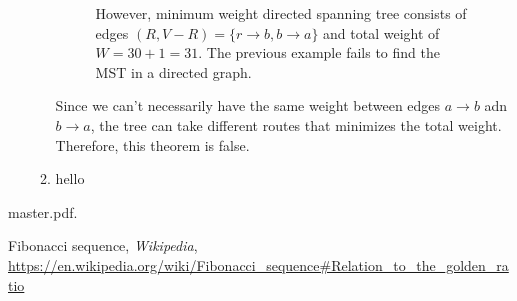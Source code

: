 \documentclass{article}
\begin{document}
\begin{enumerate}
\begin{enumerate}
\begin{figure}[H]
\begin{minipage}{0.4\textwidth}
          \caption{However, minimum weight directed spanning tree consists of edges $(R,V-R)=\{r\rightarrow b,b\rightarrow a\}$ and total weight of $W=30+1=31$. The previous example fails to find the MST in a directed graph.}
        \end{minipage}
      \end{figure}

      Since we can't necessarily have the same weight between edges $a\rightarrow b$ adn $b\rightarrow a$, the tree can take different routes that minimizes the total weight. Therefore, this theorem is false.

      \item hello
    \end{enumerate}
\end{enumerate}

\begin{thebibliography}{9}

master.pdf.

Fibonacci sequence, \emph{Wikipedia}, \url{https://en.wikipedia.org/wiki/Fibonacci_sequence#Relation_to_the_golden_ratio}

\end{thebibliography}
\end{document}
